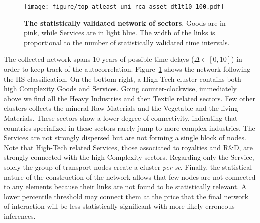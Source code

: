 \documentclass[fleqn,10pt]{article}
\begin{document}
\begin{figure}[!h]
	\centering
	\texttt{[image: figure/top\_atleast\_uni\_rca\_asset\_dt1t10\_100.pdf]}
	\caption{\textbf{The statistically validated network of sectors}. Goods are in pink, while Services are in light blue. The width of the links is proportional to the number of statistically validated time intervals.}
	\label{fig:network_hs}
\end{figure}
The collected network spans 10 years of possible time delays ($\Delta\in[0,10]$) in order to keep track of the autocorrelation.
Figure~\ref{fig:network_hs} shows the network following the HS classification.
On the bottom right, a High-Tech cluster contains both high Complexity Goods and Services. 
Going counter-clockwise, immediately above we find all the Heavy Industries and then Textile related sectors.
Few other clusters collects the mineral Raw Materials and the Vegetable and the living Materials. 
These sectors show a lower degree of connectivity, indicating that countries specialized in these sectors rarely jump to more complex industries.
The Services are not strongly dispersed but are not forming a single block of nodes. 
Note that High-Tech related Services, those associated to royalties and R\&D, are strongly connected with the high Complexity sectors. 
Regarding only the Service, solely the group of transport nodes create a cluster \textit{per se}.
Finally, the statistical nature of the construction of the network allows that few nodes are not connected to any elements because their links are not found to be statistically relevant.
A lower percentile threshold may connect them at the price that the final network of interaction will be less statistically significant with more likely erroneous inferences.
\end{document}
